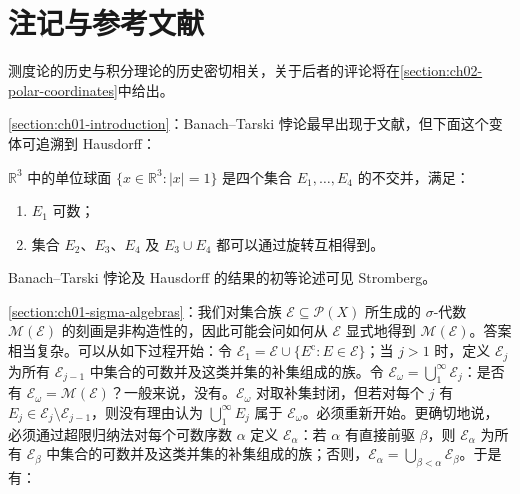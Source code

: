\documentclass[../../main.tex]{subfiles}%
\begin{document}
\section{注记与参考文献}\label{section:ch01-notes-references}

测度论的历史与积分理论的历史密切相关，关于后者的评论将在\cref{section:ch02-polar-coordinates}中给出。

\cref{section:ch01-introduction}：Banach–Tarski 悖论最早出现于文献\cite{folland-bib-011}，但下面这个变体可追溯到 Hausdorff\cite{folland-bib-068}：
\begin{proposition}\label{proposition:ch01-hausdorff-sphere-decomposition}
$\mathbb{R}^3$ 中的单位球面 $\{x\in\mathbb{R}^3:|x|=1\}$ 是四个集合 $E_1,\ldots,E_4$ 的不交并，满足：
\begin{enumerate}
\item\label{item:ch01-hausdorff-paradox-countable} $E_1$ 可数；
\item\label{item:ch01-hausdorff-paradox-rotations} 集合 $E_2$、$E_3$、$E_4$ 及 $E_3\cup E_4$ 都可以通过旋转互相得到。
\end{enumerate}
\end{proposition}
Banach–Tarski 悖论及 Hausdorff 的结果的初等论述可见 Stromberg\cite{folland-bib-146}。

\cref{section:ch01-sigma-algebras}：我们对集合族 $\mathscr{E}\subseteq\mathscr{P}(X)$ 所生成的 $\sigma$-代数 $\mathscr{M}(\mathscr{E})$ 的刻画是非构造性的，因此可能会问如何从 $\mathscr{E}$ 显式地得到 $\mathscr{M}(\mathscr{E})$。答案相当复杂。可以从如下过程开始：令 $\mathscr{E}_1=\mathscr{E}\cup\{E^{\mathrm{c}}:E\in\mathscr{E}\}$；当 $j>1$ 时，定义 $\mathscr{E}_j$ 为所有 $\mathscr{E}_{j-1}$ 中集合的可数并及这类并集的补集组成的族。令 $\mathscr{E}_\omega=\bigcup_1^\infty\mathscr{E}_j$：是否有 $\mathscr{E}_\omega=\mathscr{M}(\mathscr{E})$？一般来说，没有。$\mathscr{E}_\omega$ 对取补集封闭，但若对每个 $j$ 有 $E_j\in\mathscr{E}_j\setminus\mathscr{E}_{j-1}$，则没有理由认为 $\bigcup_1^\infty E_j$ 属于 $\mathscr{E}_\omega$。必须重新开始。更确切地说，必须通过超限归纳法对每个可数序数 $\alpha$ 定义 $\mathscr{E}_\alpha$：若 $\alpha$ 有直接前驱 $\beta$，则 $\mathscr{E}_\alpha$ 为所有 $\mathscr{E}_\beta$ 中集合的可数并及这类并集的补集组成的族；否则，$\mathscr{E}_\alpha=\bigcup_{\beta<\alpha}\mathscr{E}_\beta$。于是有：
\end{document}
